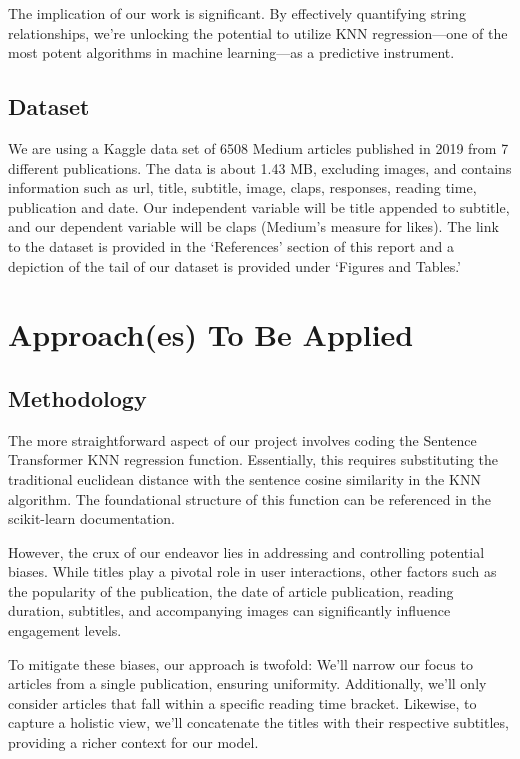 \documentclass[conference]{IEEEtran}
\begin{document}
The implication of our work is significant. By effectively quantifying string relationships, we're unlocking the potential to utilize KNN regression—one of the most potent algorithms in machine learning—as a predictive instrument.

\subsection{Dataset}
We are using a Kaggle data set of 6508 Medium articles published in 2019 from 7 different publications. The data is about 1.43 MB, excluding images, and contains information such as url, title, subtitle, image, claps, responses, reading time, publication and date. Our independent variable will be title appended to subtitle, and our dependent variable will be claps (Medium’s measure for likes). The link to the dataset is provided in the ‘References’ section of this report and a depiction of the tail of our dataset is provided under ‘Figures and Tables.’
\section{Approach(es) To Be Applied}

\subsection{Methodology}
The more straightforward aspect of our project involves coding the Sentence Transformer KNN regression function. Essentially, this requires substituting the traditional euclidean distance with the sentence cosine similarity in the KNN algorithm. The foundational structure of this function can be referenced in the scikit-learn documentation.

However, the crux of our endeavor lies in addressing and controlling potential biases. While titles play a pivotal role in user interactions, other factors such as the popularity of the publication, the date of article publication, reading duration, subtitles, and accompanying images can significantly influence engagement levels.


To mitigate these biases, our approach is twofold: We'll narrow our focus to articles from a single publication, ensuring uniformity. Additionally, we'll only consider articles that fall within a specific reading time bracket. Likewise, to capture a holistic view, we'll concatenate the titles with their respective subtitles, providing a richer context for our model.
\end{document}
